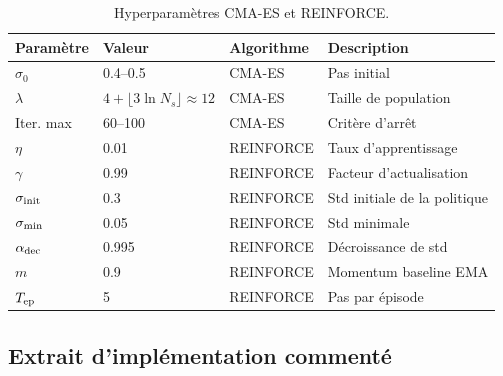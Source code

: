 \documentclass[12pt,a4paper]{article}
\begin{document}
\begin{table}[htbp]
\centering
\caption{Hyperparamètres CMA-ES et REINFORCE.}
\label{tab:cmaes-rl-params}
\begin{tabular}{llll}
\toprule
\textbf{Paramètre} & \textbf{Valeur} & \textbf{Algorithme} & \textbf{Description} \\
\midrule
$\sigma_0$ & 0.4--0.5 & CMA-ES & Pas initial \\
$\lambda$ & $4+\lfloor3\ln N_s\rfloor \approx 12$ & CMA-ES & Taille de population \\
Iter. max & 60--100 & CMA-ES & Critère d'arrêt \\
\midrule
$\eta$ & 0.01 & REINFORCE & Taux d'apprentissage \\
$\gamma$ & 0.99 & REINFORCE & Facteur d'actualisation \\
$\sigma_{\rm init}$ & 0.3 & REINFORCE & Std initiale de la politique \\
$\sigma_{\rm min}$ & 0.05 & REINFORCE & Std minimale \\
$\alpha_{\rm dec}$ & 0.995 & REINFORCE & Décroissance de std \\
$m$ & 0.9 & REINFORCE & Momentum baseline EMA \\
$T_{\rm ep}$ & 5 & REINFORCE & Pas par épisode \\
\bottomrule
\end{tabular}
\end{table}

\subsection{Extrait d'implémentation commenté}
\end{document}
